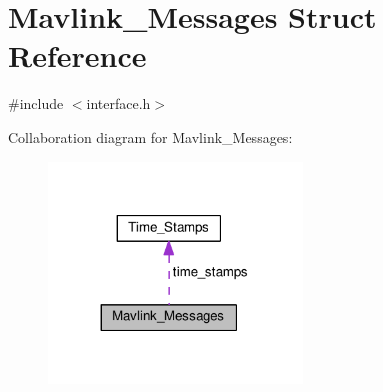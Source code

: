 \hypertarget{struct_mavlink___messages}{}\section{Mavlink\+\_\+\+Messages Struct Reference}
\label{struct_mavlink___messages}


{\ttfamily \#include $<$interface.\+h$>$}



Collaboration diagram for Mavlink\+\_\+\+Messages\+:\nopagebreak
\begin{figure}[H]
\begin{center}
\leavevmode
\includegraphics[width=191pt]{struct_mavlink___messages__coll__graph}
\end{center}
\end{figure}
